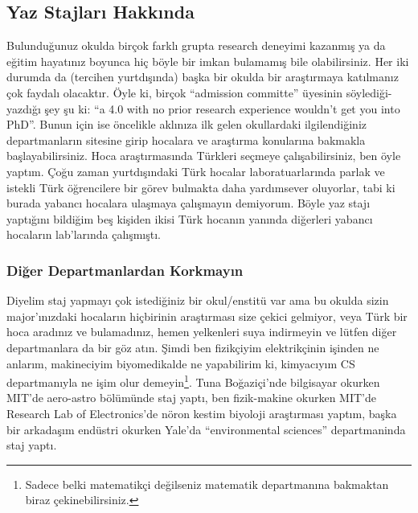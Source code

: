 \documentclass[12pt,a4paper]{article}
\begin{document}
\subsection{Yaz Stajları Hakkında}
Bulunduğunuz okulda birçok farklı grupta research deneyimi kazanmış ya da eğitim hayatınız boyunca hiç böyle bir imkan bulamamış bile olabilirsiniz. Her iki durumda da (tercihen yurtdışında) başka bir okulda bir araştırmaya katılmanız çok faydalı olacaktır. Öyle ki, birçok “admission committe” üyesinin söylediği-yazdığı şey şu ki: “a 4.0 with no prior research experience wouldn’t get you into PhD”. Bunun için ise öncelikle aklınıza ilk gelen okullardaki ilgilendiğiniz departmanların sitesine girip hocalara ve araştırma konularına bakmakla başlayabilirsiniz. Hoca araştırmasında Türkleri seç\-meye çalışabilirsiniz, ben öyle yaptım. Çoğu zaman yurtdışındaki Türk hocalar laboratuarlarında parlak ve istekli Türk öğrencilere bir görev bulmakta daha yardımsever oluyorlar, tabi ki burada yabancı hocalara ulaşmaya çalışmayın demiyorum. Böyle yaz stajı yaptığını bildiğim beş kişiden ikisi Türk hocanın yanında diğerleri yabancı hocaların lab’larında çalışmıştı. 

\subsubsection{Diğer Departmanlardan Korkmayın}
Diyelim staj yapmayı çok istediğiniz bir okul/enstitü var ama bu okulda sizin major’ınızda\-ki hocaların hiçbirinin araştırması size çekici gelmiyor, veya Türk bir hoca aradınız ve bulamadınız, hemen yelkenleri suya indirmeyin ve lütfen diğer departmanlara da bir göz atın. Şimdi ben fizikçiyim elektrikçinin işinden ne anlarım, makineciyim biyomedikalde ne yapabilirim ki, kimyacıyım CS departmanıyla ne işim olur demeyin\footnote{Sadece belki matematikçi değilseniz matematik departmanına bakmaktan biraz çekinebilirsiniz.}.  Tuna Boğaziçi’nde bilgisayar okurken MIT’de aero-astro bölümünde staj yaptı, ben fizik-makine okurken MIT’de Research Lab of Electronics’de nöron kestim biyoloji araştırması yaptım, başka bir arkadaşım endüstri okurken Yale’da “environmental sciences” departmaninda staj yaptı.
\end{document}
